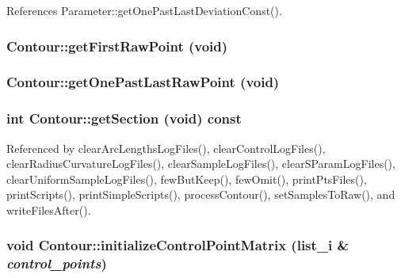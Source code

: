 References Parameter::getOnePastLastDeviationConst().\hypertarget{classContour_10b4970b043435029e202fd31717f3dd}{
\subsubsection[getFirstRawPoint]{ Contour::getFirstRawPoint (void)}}
\label{classContour_10b4970b043435029e202fd31717f3dd}


\hypertarget{classContour_b624fa91f7317166c00148135c715705}{
\subsubsection[getOnePastLastRawPoint]{ Contour::getOnePastLastRawPoint (void)}}
\label{classContour_b624fa91f7317166c00148135c715705}


\hypertarget{classContour_5f40f2e08cc648c714aca5b3763ab03c}{
\subsubsection[getSection]{\setlength{\rightskip}{0pt plus 5cm}int Contour::getSection (void) const}}
\label{classContour_5f40f2e08cc648c714aca5b3763ab03c}




Referenced by clearArcLengthsLogFiles(), clearControlLogFiles(), clearRadiusCurvatureLogFiles(), clearSampleLogFiles(), clearSParamLogFiles(), clearUniformSampleLogFiles(), fewButKeep(), fewOmit(), printPtsFiles(), printScripts(), printSimpleScripts(), processContour(), setSamplesToRaw(), and writeFilesAfter().\hypertarget{classContour_b8f0605a0056419df472cc1cb207ac30}{
\subsubsection[initializeControlPointMatrix]{\setlength{\rightskip}{0pt plus 5cm}void Contour::initializeControlPointMatrix ({\bf list\_\-i} \& {\em control\_\-points})}}
\label{classContour_b8f0605a0056419df472cc1cb207ac30}


